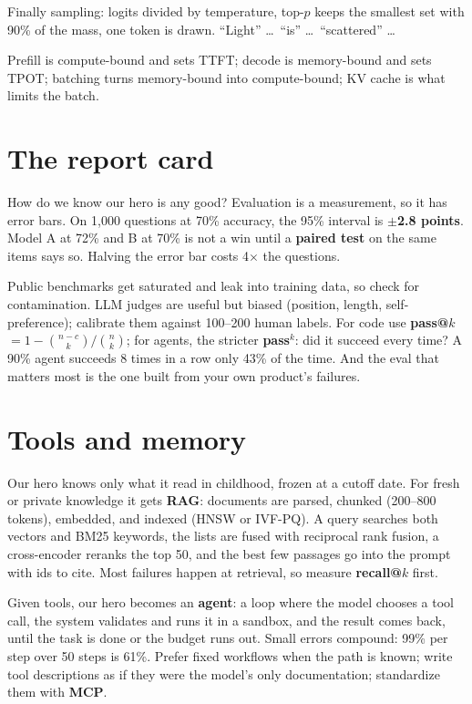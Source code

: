\documentclass[10pt,a4paper]{extarticle}
\newcommand{\hl}[1]{{\color{acc2}\textbf{#1}}}
\begin{document}
Finally sampling: logits divided by temperature, top-$p$ keeps the smallest set with 90\% of the mass, one token is drawn. ``Light'' \dots\ ``is'' \dots\ ``scattered'' \dots

\begin{mem}
Prefill is compute-bound and sets TTFT; decode is memory-bound and sets TPOT; batching turns memory-bound into compute-bound; KV cache is what limits the batch.
\end{mem}

\vspace{2mm}\section{The report card}
How do we know our hero is any good? Evaluation is a measurement, so it has error bars. On 1{,}000 questions at 70\% accuracy, the 95\% interval is \hl{$\pm$2.8 points}. Model A at 72\% and B at 70\% is not a win until a \hl{paired test} on the same items says so. Halving the error bar costs 4$\times$ the questions.

Public benchmarks get saturated and leak into training data, so check for contamination. LLM judges are useful but biased (position, length, self-preference); calibrate them against 100--200 human labels. For code use \hl{pass@$k$} $=1-\binom{n-c}{k}/\binom nk$; for agents, the stricter \hl{pass$^k$}: did it succeed every time? A 90\% agent succeeds 8 times in a row only 43\% of the time. And the eval that matters most is the one built from your own product's failures.

\vspace{2mm}\section{Tools and memory}
Our hero knows only what it read in childhood, frozen at a cutoff date. For fresh or private knowledge it gets \hl{RAG}: documents are parsed, chunked (200--800 tokens), embedded, and indexed (HNSW or IVF-PQ). A query searches both vectors and BM25 keywords, the lists are fused with reciprocal rank fusion, a cross-encoder reranks the top 50, and the best few passages go into the prompt with ids to cite. Most failures happen at retrieval, so measure \hl{recall@$k$} first.

Given tools, our hero becomes an \hl{agent}: a loop where the model chooses a tool call, the system validates and runs it in a sandbox, and the result comes back, until the task is done or the budget runs out. Small errors compound: 99\% per step over 50 steps is 61\%. Prefer fixed workflows when the path is known; write tool descriptions as if they were the model's only documentation; standardize them with \hl{MCP}.
\end{document}
